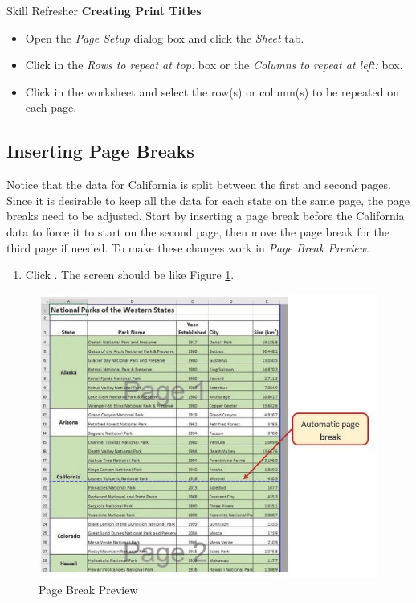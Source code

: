 \begin{center}
	\begin{sklbox}{Skill Refresher}
		\textbf{Creating Print Titles}
		\\
		\begin{itemize}
			\setlength{\itemsep}{0pt}
			\setlength{\parskip}{0pt}
			\setlength{\parsep}{0pt}

			\item Open the \textit{Page Setup} dialog box and click the \textit{Sheet} tab.
			\item Click in the \textit{Rows to repeat at top:} box or the \textit{Columns to repeat at left:} box.
			\item Click in the worksheet and select the row(s) or column(s) to be repeated on each page.
						
		\end{itemize}
	\end{sklbox}
\end{center}

\subsection{Inserting Page Breaks}

Notice that the data for California is split between the first and second pages. Since it is desirable to keep all the data for each state on the same page, the page breaks need to be adjusted. Start by inserting a page break before the California data to force it to start on the second page, then move the page break for the third page if needed. To make these changes work in \textit{Page Break Preview}.

\begin{enumerate}
	\item Click . The screen should be like Figure \ref{03:fig30}.
\end{enumerate}

\begin{figure}[H]
	\centering
	\includegraphics[width=\maxwidth{.95\linewidth}]{gfx/ch03_fig30}
	\caption{Page Break Preview}
	\label{03:fig30}
\end{figure}

